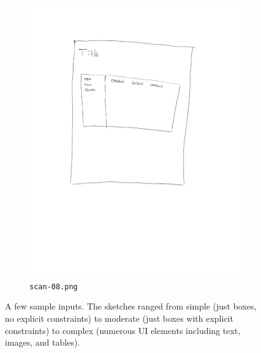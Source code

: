 \documentclass{article}
\begin{document}
\begin{figure}[h]
\begin{center}
\begin{subfigure}[b]{0.3\textwidth}
        \includegraphics[width=\textwidth]{../examples/scan-08.png}
        \caption{\texttt{scan-08.png}}
    \end{subfigure}
\end{center}
\caption{A few sample inputs. The sketches ranged from simple (just boxes, no
    explicit constraints) to moderate (just boxes with explicit constraints) to
    complex (numerous UI elements including text, images, and tables).}
\label{fig:sample-inputs}
\end{figure}
\end{document}
